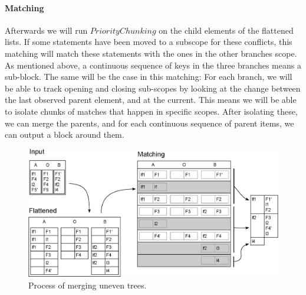 \documentclass[11pt]{article}
\begin{document}
\paragraph{Matching} Afterwards we will run $PriorityChunking$ on the child elements of the flattened lists. If some statements have been moved to a subscope for these conflicts, this matching will match these statements with the ones in the other branches scope. As mentioned above, a continuous sequence of keys in the three branches means a sub-block. The same will be the case in this matching: For each branch, we will be able to track opening and closing sub-scopes by looking at the change between the last observed parent element, and at the current. This means we will be able to isolate chunks of matches that happen in specific scopes. After isolating these, we can merge the parents, and for each continuous sequence of parent items, we can output a block around them.

\begin{figure}
   \centerline{\includegraphics[scale=0.55]{drawings/html/EditedFlattenedMerge.eps}}
   \caption{Process of merging uneven trees.}
   \label{UeventreeProcess}
\end{figure}
\end{document}
